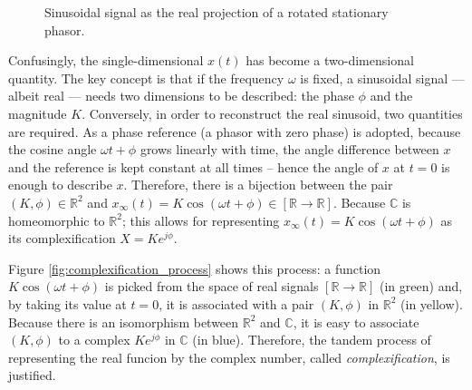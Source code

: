 \begin{figure}[htb]
	\caption{Sinusoidal signal as the real projection of a rotated stationary phasor.}
	\label{fig:static_phasor_representation}
\end{figure} %

	Confusingly, the single-dimensional $x(t)$ has become a two-dimensional quantity. The key concept is that if the frequency $\omega$ is fixed, a sinusoidal signal — albeit real — needs two dimensions to be described: the phase $\phi$ and the magnitude $K$. Conversely, in order to reconstruct the real sinusoid, two quantities are required. As a phase reference (a phasor with zero phase) is adopted, because the cosine angle $\omega t + \phi$ grows linearly with time, the angle difference between $x$ and the reference is kept constant at all times -- hence the angle of $x$ at $t = 0$ is enough to describe $x$. Therefore, there is a bijection between the pair $\left(K,\phi\right)\in\mathbb{R}^2$ and $x_\infty(t) = K\cos\left(\omega t + \phi\right)\in\left[\mathbb{R}\to\mathbb{R}\right]$. Because $\mathbb{C}$ is homeomorphic to $\mathbb{R}^2$; this allows for representing $x_\infty(t) = K\cos\left(\omega t + \phi\right)$ as its complexification $X = Ke^{j\phi}$.
\par
	Figure \ref{fig:complexification_process} shows this process: a function $K\cos\left(\omega t + \phi\right)$ is picked from the space of real signals $\left[\mathbb{R}\to\mathbb{R}\right]$ (in green) and, by taking its value at $t = 0$, it is associated with a pair $\left(K,\phi\right)$ in $\mathbb{R}^2$ (in yellow). Because there is an isomorphism between $\mathbb{R}^2$ and $\mathbb{C}$, it is easy to associate $\left(K,\phi\right)$ to a complex $Ke^{j\phi}$ in $\mathbb{C}$ (in blue). Therefore, the tandem process of representing the real funcion by the complex number, called \textit{complexification}, is justified. 

